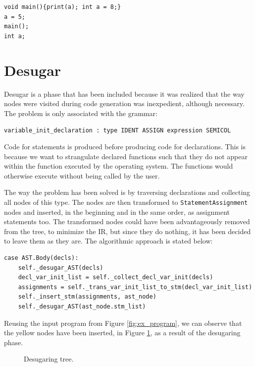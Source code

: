 \begin{verbatim}
void main(){print(a); int a = 8;}
a = 5;
main();
int a;
\end{verbatim}

\section{Desugar}\label{sec:desugar}
Desugar is a phase that has been included because it was realized that the way nodes were visited during code generation was inexpedient, although necessary. The problem is only associated with the grammar:

\begin{center}
\texttt{variable\_init\_declaration : type IDENT ASSIGN expression SEMICOL}
\end{center}

Code for statements is produced before producing code for declarations. This is because we want to strangulate declared functions such that they do not appear within the function executed by the operating system. The functions would otherwise execute without being called by the user.

The way the problem has been solved is by traversing declarations and collecting all nodes of this type. The nodes are then transformed to \texttt{StatementAssignment} nodes and inserted, in the beginning and in the same order, as assignment statements too. The transformed nodes could have been advantageously removed from the tree, to minimize the IR, but since they do nothing, it has been decided to leave them as they are. The algorithmic approach is stated below:

\begin{verbatim}
case AST.Body(decls):
    self._desugar_AST(decls)
    decl_var_init_list = self._collect_decl_var_init(decls)
    assignments = self._trans_var_init_list_to_stm(decl_var_init_list)
    self._insert_stm(assignments, ast_node)
    self._desugar_AST(ast_node.stm_list)
\end{verbatim}

Reusing the input program from Figure \ref{fig:ex_program}, we can observe that the yellow nodes have been inserted, in Figure \ref{fig:desugar}, as a result of the desugaring phase.

\begin{figure}[H]
    \centering
    
    \caption{Desugaring tree.} 
    \label{fig:desugar}
\end{figure}


